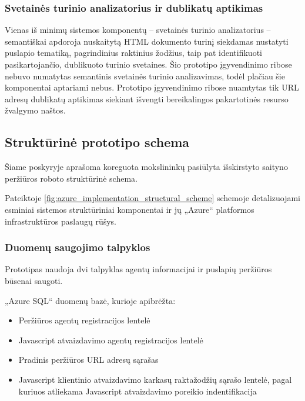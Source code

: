 \subsubsection{Svetainės turinio analizatorius ir dublikatų aptikimas}

Vienas iš minimų sistemos komponentų -- svetainės turinio analizatorius -- semantiškai apdoroja nuskaitytą HTML dokumento turinį siekdamas nustatyti puslapio tematiką, pagrindinius raktinius žodžius, taip pat identifikuoti pasikartojančio, dublikuoto turinio svetaines. Šio prototipo įgyvendinimo ribose nebuvo numatytas semantinis svetainės turinio analizavimas, todėl plačiau šie komponentai aptariami nebus. Prototipo įgyvendinimo ribose nuamtytas tik URL adresų dublikatų aptikimas siekiant išvengti bereikalingos pakartotinės resurso žvalgymo naštos.

\subsection{Struktūrinė prototipo schema}

Šiame poskyryje aprašoma koreguota \cite{MercedCloudBasedWebCrawler} mokslininkų pasiūlyta išskirstyto saityno peržiūros roboto struktūrinė schema.

Pateiktoje \ref{fig:azure_implementation_structural_scheme} schemoje detalizuojami esminiai sistemos struktūriniai komponentai ir jų „Azure“ platformos infrastruktūros paslaugų rūšys.



\subsubsection{Duomenų saugojimo talpyklos}

Prototipas naudoja dvi talpyklas agentų informacijai ir puslapių peržiūros būsenai saugoti.


„Azure SQL“ duomenų bazė, kurioje apibrėžta:

\begin{itemize}
    \item Peržiūros agentų registracijos lentelė
    \item Javascript atvaizdavimo agentų registracijos lentelė
    \item Pradinis peržiūros URL adresų sąrašas
    \item Javascript klientinio atvaizdavimo karkasų raktažodžių sąrašo lentelė, pagal kuriuos atliekama Javascript atvaizdavimo poreikio indentifikacija
\end{itemize}

